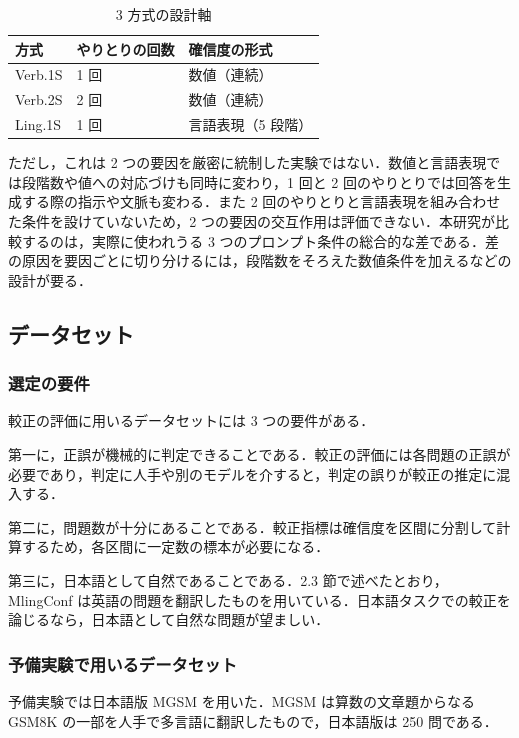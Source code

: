 \begin{table}[htbp]
\centering
\small
\caption{3 方式の設計軸}
\label{tab:3.2}
\begin{tabular}{|l|l|l|}
\hline
方式 & やりとりの回数 & 確信度の形式 \\
\hline
Verb.1S & 1 回 & 数値（連続） \\
Verb.2S & 2 回 & 数値（連続） \\
Ling.1S & 1 回 & 言語表現（5 段階） \\
\hline
\end{tabular}
\end{table}

ただし，これは 2 つの要因を厳密に統制した実験ではない．数値と言語表現では段階数や値への対応づけも同時に変わり，1 回と 2 回のやりとりでは回答を生成する際の指示や文脈も変わる．また 2 回のやりとりと言語表現を組み合わせた条件を設けていないため，2 つの要因の交互作用は評価できない．本研究が比較するのは，実際に使われうる 3 つのプロンプト条件の総合的な差である．差の原因を要因ごとに切り分けるには，段階数をそろえた数値条件を加えるなどの設計が要る．

\subsection{データセット}

\subsubsection{選定の要件}

較正の評価に用いるデータセットには 3 つの要件がある．

第一に，正誤が機械的に判定できることである．較正の評価には各問題の正誤が必要であり，判定に人手や別のモデルを介すると，判定の誤りが較正の推定に混入する．

第二に，問題数が十分にあることである．較正指標は確信度を区間に分割して計算するため，各区間に一定数の標本が必要になる．

第三に，日本語として自然であることである．2.3 節で述べたとおり，MlingConf は英語の問題を翻訳したものを用いている．日本語タスクでの較正を論じるなら，日本語として自然な問題が望ましい．

\subsubsection{予備実験で用いるデータセット}

予備実験では日本語版 MGSM \cite{shi2023mgsm} を用いた．MGSM は算数の文章題からなるGSM8K \cite{cobbe2021gsm8k} の一部を人手で多言語に翻訳したもので，日本語版は 250 問である．

